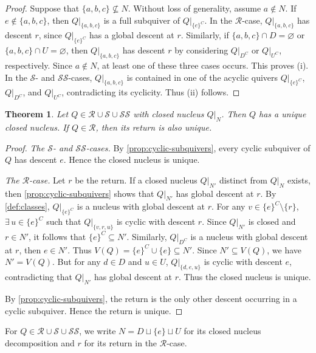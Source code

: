 \documentclass[10pt,a4paper]{amsart}
\newtheorem{theorem}{Theorem}[section]
\theoremstyle{definition}
\theoremstyle{definition}
\numberwithin{equation}{section}
\numberwithin{table}{section}
\newcommand{\Rclass}{\mathcal{R}}
\newcommand{\SSclass}{\mathcal{SS}}
\newcommand{\Sclass}{\mathcal{S}}
\begin{document}
\begin{proof}
Suppose that $\{a,b,c\}\nsubseteq N$. Without loss of generality, assume
$a\notin N$. If $e\notin\{a,b,c\}$, then $Q|_{\{a,b,c\}}$ is a full
subquiver of $Q|_{\{e\}^C}$. In the $\Rclass$-case,
$Q|_{\{a,b,c\}}$ has descent $r$, since $Q|_{\{e\}^C}$ has a global descent at $r$.
Similarly, if $\{a,b,c\}\cap D=\varnothing$ or
$\{a,b,c\}\cap U=\varnothing$, then $Q|_{\{a,b,c\}}$ has descent $r$ by considering
$Q|_{D^C}$ or $Q|_{U^C}$, respectively. Since $a\notin N$, at least one of
these three cases occurs. This proves (i). In the $\Sclass$- and
$\SSclass$-cases, $Q|_{\{a,b,c\}}$ is contained in one of the acyclic quivers
$Q|_{\{e\}^C}$, $Q|_{D^C}$, and $Q|_{U^C}$, contradicting its cyclicity.
Thus (ii) follows.
\end{proof}

\begin{theorem}\label{thm:nucleus-uniqueness}
Let $Q\in\Rclass\cup\Sclass\cup\SSclass$ with closed nucleus $Q|_N$. Then $Q$ has a unique closed nucleus.
If $Q\in\Rclass$, then its return is also unique.
\end{theorem}

\begin{proof}
\emph{The $\Sclass$- and $\SSclass$-cases.} By
\cref{prop:cyclic-subquivers}, every cyclic subquiver of $Q$ has descent $e$.
Hence the closed nucleus is unique.

\emph{The $\Rclass$-case.} Let $r$ be the return.
If a closed nucleus $Q|_{N'}$ distinct from $Q|_N$ exists, then
\cref{prop:cyclic-subquivers} shows that $Q|_{N'}$ has global descent at $r$.
By \cref{def:classes}, $Q|_{\{e\}^C}$ is a nucleus with global descent at $r$.
For any $v\in\{e\}^C\setminus\{r\}$, $\exists\,u\in\{e\}^C$ such that $Q|_{\{v,r,u\}}$ is cyclic with descent $r$.
Since $Q|_{N'}$ is closed and $r\in N'$, it follows that $\{e\}^C\subseteq N'$.
Similarly, $Q|_{D^C}$ is a nucleus with global descent at $r$, then $e\in N'$. Thus $V(Q)=\{e\}^C\cup\{e\}\subseteq N'$.
Since $N'\subseteq V(Q)$, we have $N'=V(Q)$. But for any $d\in D$ and $u\in U$,
$Q|_{\{d,e,u\}}$ is cyclic with descent $e$, contradicting that $Q|_{N'}$
has global descent at $r$. Thus the closed nucleus is unique.

By \cref{prop:cyclic-subquivers}, the return is the only other descent occurring
in a cyclic subquiver. Hence the return is unique.
\end{proof}

For $Q\in\Rclass\cup\Sclass\cup\SSclass$, we write $N=D\sqcup\{e\}\sqcup U$
for its closed nucleus decomposition and $r$ for its return in the
$\Rclass$-case.
\end{document}
